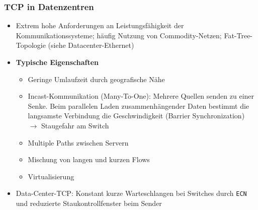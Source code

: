 \subsubsection{TCP in Datenzentren}
\begin{itemize}
	\item Extrem hohe Anforderungen an Leistungsfähigkeit der Kommunikationssysteme; häufig Nutzung von Commodity-Netzen; Fat-Tree-Topologie (siehe Datacenter-Ethernet)
	\item \textbf{Typische Eigenschaften}
	\begin{itemize}
		\item Geringe Umlaufzeit durch geografische Nähe
		\item Incast-Kommunikation (Many-To-One): Mehrere Quellen senden zu einer Senke. Beim parallelen Laden zusammenhängender Daten bestimmt die langsamste Verbindung die Geschwindigkeit (Barrier Synchronization) \(\rightarrow\) Staugefahr am Switch
		\item Multiple Paths zwischen Servern
		\item Mischung von langen und kurzen Flows
		\item Virtualisierung
	\end{itemize}
	\item Data-Center-TCP: Konstant kurze Warteschlangen bei Switches durch \texttt{ECN} und reduzierte Staukontrollfenster beim Sender
\end{itemize}

